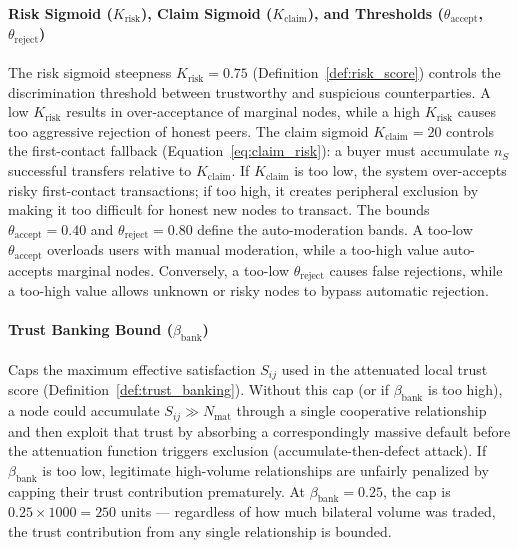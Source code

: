 \documentclass[11pt]{article}
\begin{document}
\paragraph{Risk Sigmoid ($K_{\text{risk}}$), Claim Sigmoid ($K_{\text{claim}}$), and Thresholds ($\theta_{\text{accept}}$, $\theta_{\text{reject}}$)}
The risk sigmoid steepness $K_{\text{risk}} = 0.75$ (Definition~\ref{def:risk_score}) controls the discrimination threshold between trustworthy and suspicious counterparties. A low $K_{\text{risk}}$ results in over-acceptance of marginal nodes, while a high $K_{\text{risk}}$ causes too aggressive rejection of honest peers. The claim sigmoid $K_{\text{claim}} = 20$ controls the first-contact fallback (Equation~\ref{eq:claim_risk}): a buyer must accumulate $n_S$ successful transfers relative to $K_{\text{claim}}$. If $K_{\text{claim}}$ is too low, the system over-accepts risky first-contact transactions; if too high, it creates peripheral exclusion by making it too difficult for honest new nodes to transact. The bounds $\theta_{\text{accept}} = 0.40$ and $\theta_{\text{reject}} = 0.80$ define the auto-moderation bands. A too-low $\theta_{\text{accept}}$ overloads users with manual moderation, while a too-high value auto-accepts marginal nodes. Conversely, a too-low $\theta_{\text{reject}}$ causes false rejections, while a too-high value allows unknown or risky nodes to bypass automatic rejection.

\paragraph{Trust Banking Bound ($\beta_{\text{bank}}$)}
Caps the maximum effective satisfaction $S_{ij}$ used in the attenuated local trust score (Definition~\ref{def:trust_banking}). Without this cap (or if $\beta_{\text{bank}}$ is too high), a node could accumulate $S_{ij} \gg N_{\text{mat}}$ through a single cooperative relationship and then exploit that trust by absorbing a correspondingly massive default before the attenuation function triggers exclusion (accumulate-then-defect attack). If $\beta_{\text{bank}}$ is too low, legitimate high-volume relationships are unfairly penalized by capping their trust contribution prematurely. At $\beta_{\text{bank}} = 0.25$, the cap is $0.25 \times 1000 = 250$ units --- regardless of how much bilateral volume was traded, the trust contribution from any single relationship is bounded.
\end{document}
